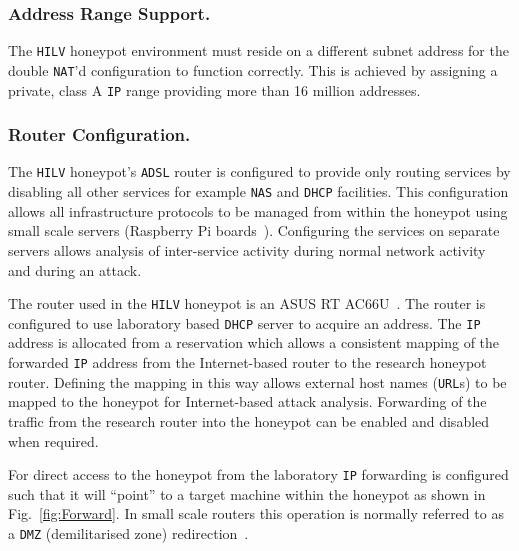 \documentclass{llncs}
\begin{document}
\subsubsection{Address Range Support.}

The \texttt{HILV} honeypot environment must reside on a different subnet
address for the double \texttt{NAT}'d configuration to function correctly. This
is achieved by assigning a private, class A \texttt{IP} range providing more
than 16 million addresses.

\subsubsection{Router Configuration.}

The \texttt{HILV} honeypot's \texttt{ADSL} router is configured to provide only
routing services by disabling all other services for example \texttt{NAS} and
\texttt{DHCP} facilities. This configuration allows all infrastructure
protocols to be managed from within the honeypot using small scale servers
(Raspberry Pi boards~\cite{RASP:17}). Configuring the services on separate
servers allows analysis of inter-service activity during normal network
activity and during an attack.

The router used in the \texttt{HILV} honeypot is an ASUS RT
AC66U~\cite{ASUS:17}. The router is configured to use laboratory based
\texttt{DHCP} server to acquire an  address. The \texttt{IP} address is
allocated from a reservation which allows a consistent mapping of the forwarded
\texttt{IP} address from the Internet-based router to the research honeypot
router. Defining the mapping in this way allows external host names
(\texttt{URL}s) to be mapped to the honeypot for Internet-based attack
analysis. Forwarding of the traffic from the research router into the honeypot
can be enabled and disabled when required.

For direct access to the honeypot from the laboratory \texttt{IP} forwarding is
configured such that it will ``point'' to a target machine within the honeypot
as shown in Fig.~\ref{fig:Forward}. In small scale routers this operation is
normally referred to as a \texttt{DMZ} (demilitarised zone)
redirection~\cite{DK:08,MB:01}.
\end{document}
